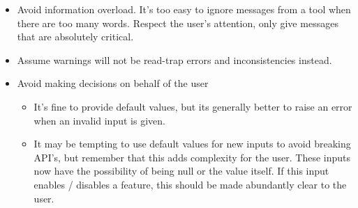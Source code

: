 \documentclass[]{nrel}
\begin{document}
\begin{appendices}
\begin{itemize}
\begin{itemize}
\begin{itemize}
\end{itemize}

\end{itemize}

\item Avoid information overload. It’s too easy to ignore messages from a tool when there are
too many words. Respect the user’s attention, only give messages that are absolutely critical.

\item Assume warnings will not be read-trap errors and inconsistencies instead.

\item Avoid making decisions on behalf of the user
\begin{itemize}
\item It’s fine to provide default values, but its generally better to raise an error
when an invalid input is given.

\item It may be tempting to use default values for new inputs to avoid breaking API’s, but
remember that this adds complexity for the user. These inputs now have the possibility
of being null or the value itself. If this input enables / disables a feature, this should
be made abundantly clear to the user.

\end{itemize}

\end{itemize}

\end{appendices}
\end{document}
